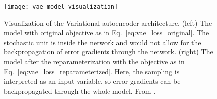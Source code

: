 \documentclass[6pt]{article}
\begin{document}
\begin{figure}[h!] %
   \centering
   \texttt{[image: vae\_model\_visualization]} 
   \caption{Visualization of the Variational autoencoder architecture. (left) The model with original objective as in Eq.~\ref{eq:vae_loss_original}. The stochastic unit is inside the network and would not allow for the backpropagation of error gradients through the network. (right) The model after the reparameterization with the objective as in Eq.~\ref{eq:vae_loss_reparameterized}. Here, the sampling is interpreted as an input variable, so error gradients can be backpropagated through the whole model. From \cite{doersch2016tutorial}.}
   \label{fig:vae_model_visualization}
\end{figure}
\end{document}
